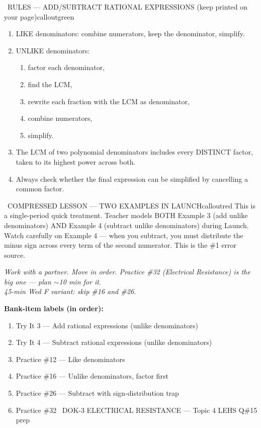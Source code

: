 \documentclass[11pt]{article}
\begin{document}
\begin{callout}{\IconBook\ RULES --- ADD/SUBTRACT RATIONAL EXPRESSIONS (keep printed on your page)}{calloutgreen}
\begin{enumerate}[leftmargin=2.1em,itemsep=1pt,topsep=3pt]
  \item LIKE denominators: combine numerators, keep the denominator, simplify.
  \item UNLIKE denominators:
  \begin{enumerate}[label=(\alph*),leftmargin=1.8em,itemsep=1pt,topsep=2pt]
    \item factor each denominator,
    \item find the LCM,
    \item rewrite each fraction with the LCM as denominator,
    \item combine numerators,
    \item simplify.
  \end{enumerate}
  \item The LCM of two polynomial denominators includes every DISTINCT factor, taken to its highest power across both.
  \item Always check whether the final expression can be simplified by cancelling a common factor.
\end{enumerate}
\end{callout}

\begin{callout}{\IconWarn\ COMPRESSED LESSON --- TWO EXAMPLES IN LAUNCH}{calloutred}
This is a single-period quick treatment. Teacher models BOTH Example 3 (add unlike denominators) AND Example 4 (subtract unlike denominators) during Launch.\\
Watch carefully on Example 4 --- when you subtract, you must distribute the minus sign across every term of the second numerator. This is the \#1 error source.
\end{callout}

\textit{Work with a partner. Move in order. Practice \#32 (Electrical Resistance) is the big one --- plan \(\sim\)10 min for it.}\\
\textit{45-min Wed F variant: skip \#16 and \#26.}

\textbf{Bank-item labels (in order):}
\begin{enumerate}[leftmargin=1.6em,itemsep=2pt,topsep=2pt]
  \item Try It 3 --- Add rational expressions (unlike denominators)
  \item Try It 4 --- Subtract rational expressions (unlike denominators)
  \item Practice \#12 --- Like denominators
  \item Practice \#16 --- Unlike denominators, factor first
  \item Practice \#26 --- Subtract with sign-distribution trap
  \item Practice \#32 \IconStar\ DOK-3 ELECTRICAL RESISTANCE --- Topic 4 LEHS Q\#15 prep
\end{enumerate}
\end{document}
